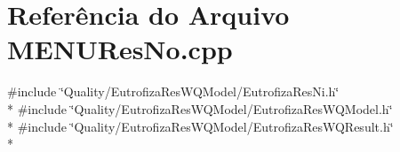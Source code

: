 \section{Referência do Arquivo M\+E\+N\+U\+Res\+No.\+cpp}
\label{_m_e_n_u_res_no_8cpp}
{\ttfamily \#include \char`\"{}Quality/\+Eutrofiza\+Res\+W\+Q\+Model/\+Eutrofiza\+Res\+Ni.\+h\char`\"{}}\\*
{\ttfamily \#include \char`\"{}Quality/\+Eutrofiza\+Res\+W\+Q\+Model/\+Eutrofiza\+Res\+W\+Q\+Model.\+h\char`\"{}}\\*
{\ttfamily \#include \char`\"{}Quality/\+Eutrofiza\+Res\+W\+Q\+Model/\+Eutrofiza\+Res\+W\+Q\+Result.\+h\char`\"{}}\\*
